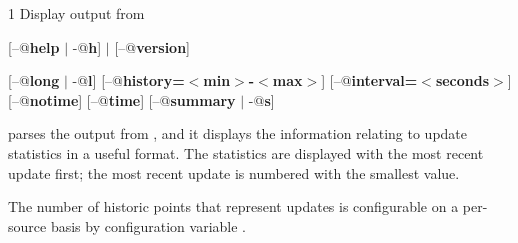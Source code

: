 \begin{ManPage}{\label{man-condor-updates-stats}}{1}
{Display output from }


\Synopsis {}
[\verb@--@\textbf{help} $|$ \verb@-@\textbf{h}] $|$ [\verb@--@\textbf{version}]

[\verb@--@\textbf{long} $|$ \verb@-@\textbf{l}]
[\verb@--@\textbf{history=$<$min$>$-$<$max$>$}]
[\verb@--@\textbf{interval=$<$seconds$>$}]
[\verb@--@\textbf{notime}]
[\verb@--@\textbf{time}]
[\verb@--@\textbf{summary} $|$ \verb@-@\textbf{s}]





\Description 

 parses the output from ,
and it displays the information relating to update statistics
in a useful format.
The statistics are displayed with the most recent update first;
the most recent update is numbered with the smallest value.

The number of historic points that represent updates is
configurable on a per-source basis by configuration variable
.


\end{ManPage}
